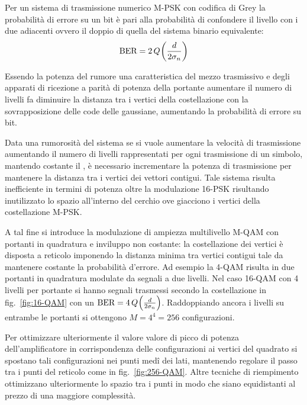 Per un sistema di trasmissione numerico M-\ac{PSK} con codifica di Grey la probabilità di errore su un bit è pari alla probabilità di confondere il livello con i due adiacenti ovvero il doppio di quella del sistema binario equivalente:
\begin{equation}
\text{BER}=2\,{Q}^{}\!\left({\frac{d}{2\sigma_n}}\right)
\label{eq:qam_mpsk_biterrorrate}
\end{equation}

Essendo la potenza del rumore una caratteristica del mezzo trasmissivo e degli apparati di ricezione a parità di potenza della portante aumentare il numero di livelli fa diminuire la distanza tra i vertici della costellazione con la sovrapposizione delle code delle gaussiane, aumentando la probabilità di errore su bit.

Data una rumorosità del sistema se si vuole aumentare la velocità di trasmissione aumentando il numero di livelli rappresentati per ogni trasmissione di un simbolo, mantendo costante il , è necessario incrementare la potenza di trasmissione per mantenere la distanza tra i vertici dei vettori contigui.
Tale sistema risulta inefficiente in termini di potenza oltre la modulazione 16-\ac{PSK} risultando inutilizzato lo spazio all'interno del cerchio ove giacciono i vertici della costellazione M-\ac{PSK}.

A tal fine si introduce la modulazione di ampiezza multilivello M-\ac{QAM} con portanti in quadratura e inviluppo non costante: la costellazione dei vertici è disposta a reticolo imponendo la distanza minima tra vertici contigui tale da mantenere costante la probabilità d'errore. Ad esempio la 4-\ac{QAM} risulta in due portanti in quadratura modulate da segnali a due livelli. Nel caso 16-\ac{QAM} con 4 livelli per portante si hanno segnali trasmessi secondo la costellazione in fig.~\ref{fig:16-QAM} con un $\text{BER}=4\,{Q}^{}\!\left({\frac{d}{2\sigma_n}}\right)$. Raddoppiando ancora i livelli su entrambe le portanti si ottengono $M=4^4=256$ configurazioni.

Per ottimizzare ulteriormente il valore valore di picco di potenza dell'amplificatore in corrispondenza delle configurazioni ai vertici del quadrato si spostano tali configurazioni nei punti med\^{i} dei lati, mantenendo regolare il passo tra i punti del reticolo come in fig.~\ref{fig:256-QAM}. Altre tecniche di riempimento ottimizzano ulteriormente lo spazio tra i punti in modo che siano equidistanti al prezzo di una maggiore complessità.


